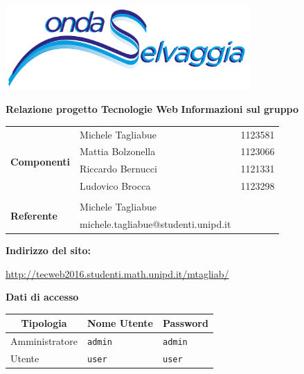 

 	\begin{titlepage} 
 	\centering
 	\includegraphics[width=0.70\textwidth]{images/new_logo_min.png}\par \vspace{1cm}
 	{\LARGE\textbf{Relazione progetto Tecnologie Web}}\vspace{2cm}	
 	{\large\textbf{Informazioni sul gruppo}}\vspace{0.5cm}
 	\begin{tabular}{ l | l  c}
 		\multirow{5}{*}{\textbf{Componenti}}
 		&Michele Tagliabue & 1123581 \\	
 		&Mattia Bolzonella &1123066\\
 		&Riccardo Bernucci &1121331\\
 		&Ludovico Brocca & 1123298\\ 
 		&\\
 		\multirow{2}{*}{\textbf{Referente}}
 		&Michele Tagliabue &\\ 
 		&michele.tagliabue@studenti.unipd.it &\\
 	\end{tabular}\vspace{1.2cm}
 	
 	{\large\textbf{Indirizzo del sito: }}
 	
 	{\large \url{http://tecweb2016.studenti.math.unipd.it/mtagliab/}}
 	\vspace{2cm}
 	
 	\textbf{Dati di accesso}
 	\begin{table}[H]
 		\centering
 		\begin{tabular}{| l | l | l |}	
 			\hline
 			\multicolumn{1}{|c|}{\bfseries Tipologia} & \multicolumn{1}{c}{\bfseries Nome Utente} & \multicolumn{1}{|c|}{\bfseries Password} \\
 			\hline
 			Amministratore&\texttt{admin}&\texttt{admin}\\
 			Utente&\texttt{user}&\texttt{user}\\
 			\hline
 		\end{tabular}
 	\end{table}
 \end{titlepage}
	\newpage
	\tableofcontents
	\newpage
	
	
	
	
	
%	
	
	
	
